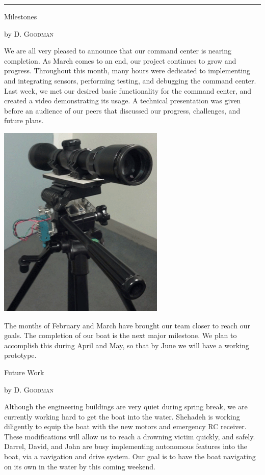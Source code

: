 \documentclass[10pt,a4paper]{article}
\newcommand{\SepRule}{\noindent							 %
						\begin{center}
							\rule{250pt}{1pt}
						\end{center}
						}
\newcommand{\NewsItem}[1]{%
		\usefont{T1}{augie}{m}{n} 	
		\large #1 \vspace{4pt}
		\par \normalsize \normalfont}
\newcommand{\NewsAuthor}[1]{%
			\hfill by \textsc{#1} \vspace{4pt}
			\par \normalfont}
\begin{document}
% 
\vspace{0.5cm}
	\SepRule
\vspace{0.5cm}
\begin{multicols}{3}
	\NewsItem{Milestones}
	\NewsAuthor{D. Goodman}
    
    We are all very pleased to announce that our command center is nearing completion. As March comes to an end, our project continues to grow and progress. Throughout this month, many hours were dedicated to implementing and integrating sensors, performing testing, and debugging the command center. Last week, we met our desired basic functionality for the command center, and created a video demonstrating its usage. A technical presentation was given before an audience of our peers that discussed our progress, challenges, and future plans.
\begin{center}
			\includegraphics[width=0.63\linewidth]{cc.png}
		\end{center}
The months of February and March have brought our team closer to reach our goals. The completion of our boat is the next major milestone. We plan to accomplish this during April and May, so that by June we will have a working prototype. 
		

\vspace{1cm}
\NewsItem{Future Work}
\NewsAuthor{D. Goodman}
	Although the engineering buildings are very quiet during spring break, we are currently working hard to get the boat into the water. Shehadeh is working diligently to equip the boat with the new motors and emergency RC receiver. These modifications will allow us to reach a drowning victim quickly, and safely. Darrel, David, and John are busy implementing autonomous features into the boat, via a navigation and drive system. Our goal is to have the boat navigating on its own in the water by this coming weekend.


\end{multicols}
\end{document}
